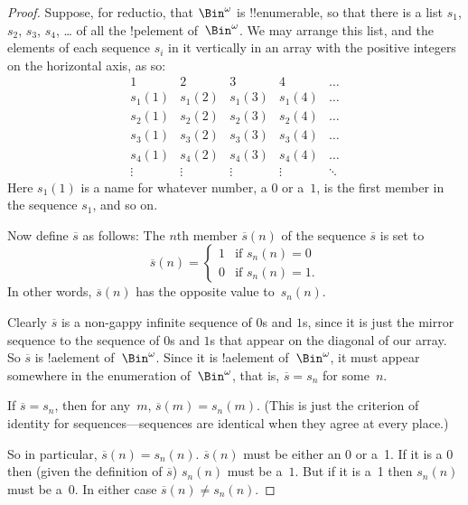\documentclass[../../include/open-logic-section]{subfiles}
\begin{document}
\begin{proof}
Suppose, for reductio, that $\Bin^\omega$ is !!{enumerable}, so that
there is a list $s_{1}$, $s_{2}$, $s_{3}$, $s_{4}$, \dots{} of all the
!p{element} of~$\Bin^\omega$.  We may arrange this list, and the
elements of each sequence $s_i$ in it vertically in an array with the
positive integers on the horizontal axis, as so:
\[
\begin{array}{c|c|c|c|c}
1 & 2 & 3 & 4 & \dots \\\hline
s_{1}(1) & s_{1}(2) & s_{1}(3) & s_1(4) & \dots \\\hline
s_{2}(1)& s_{2}(2) & s_2(3) & s_2(4) & \dots \\\hline
s_{3}(1)& s_{3}(2) & s_3(3) & s_3(4) & \dots \\\hline
s_{4}(1)& s_{4}(2) & s_4(3) & s_4(4) & \dots \\\hline
\vdots & \vdots & \vdots & \vdots & \ddots
\end{array}
\]
Here $s_{1}(1)$ is a name for whatever number, a $0$ or a~$1$, is the
first member in the sequence $s_{1}$, and so on.

Now define $\overline{s}$ as follows: The $n$th member
$\overline{s}(n)$ of the sequence
$\overline{s}$ is set to
\[
\overline{s}(n) = 
\begin{cases}
1 & \text{if $s_{n}(n) = 0$}\\
0 & \text{if $s_{n}(n) = 1$}.
\end{cases}
\]
In other words, $\overline{s}(n)$ has the opposite value to~$s_{n}(n)$.

Clearly $\overline{s}$ is a non-gappy infinite sequence of $0$s and
$1$s, since it is just the mirror sequence to the sequence of $0$s and
$1$s that appear on the diagonal of our array. So $\overline{s}$ is
!a{element} of~$\Bin^\omega$. Since it is !a{element}
of~$\Bin^\omega$, it must appear somewhere in the enumeration
of~$\Bin^\omega$, that is, $\overline{s} = s_{n}$ for some~$n$.

If $\overline{s} = s_{n}$, then for any~$m$, $\overline{s}(m) =
s_{n}(m)$. (This is just the criterion of identity for
sequences---sequences are identical when they agree at every place.)

So in particular, $\overline{s}(n) = s_{n}(n)$. $\overline{s}(n)$ must
be either an 0 or a~1. If it is a 0 then (given the definition of
$\overline{s}$) $s_{n}(n)$ must be a~$1$. But if it is a~1 then
$s_{n}(n)$ must be a~0. In either case $\overline{s}(n) \neq
s_{n}(n)$.
\end{proof}
\end{document}
